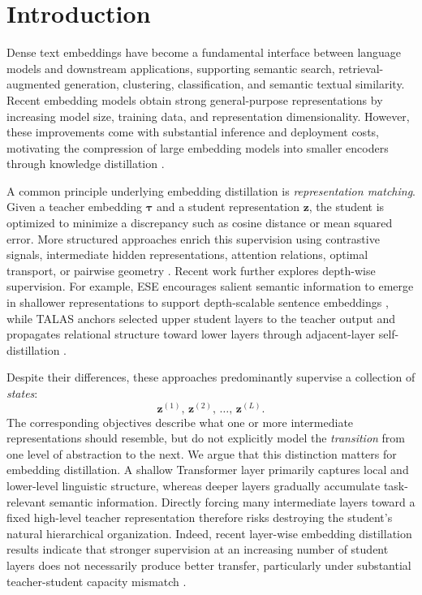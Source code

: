 \documentclass[11pt]{article}
\begin{document}

\section{Introduction}\label{sec:introduction}

Dense text embeddings have become a fundamental interface between language
models and downstream applications, supporting semantic search,
retrieval-augmented generation, clustering, classification, and semantic
textual similarity. Recent embedding models obtain strong general-purpose
representations by increasing model size, training data, and representation
dimensionality. However, these improvements come with substantial inference
and deployment costs, motivating the compression of large embedding models
into smaller encoders through knowledge distillation
\citep{hinton2015distilling,reimers2020multilingual,xu2023distillcse,
zhang2024jasper,truong2025emo}.

A common principle underlying embedding distillation is
\emph{representation matching}. Given a teacher embedding
$\boldsymbol{\tau}$ and a student representation $\mathbf{z}$, the student
is optimized to minimize a discrepancy such as cosine distance or mean
squared error. More structured approaches enrich this supervision using
contrastive signals, intermediate hidden representations, attention
relations, optimal transport, or pairwise geometry
\citep{xu2023distillcse,truong2025emo}.
Recent work further explores depth-wise supervision. For example,
ESE encourages salient semantic information to emerge in shallower
representations to support depth-scalable sentence embeddings
\citep{li2025ese}, while TALAS anchors selected upper student layers to the
teacher output and propagates relational structure toward lower layers
through adjacent-layer self-distillation \citep{talas}.

Despite their differences, these approaches predominantly supervise a
collection of \emph{states}:
\begin{equation}
    \mathbf{z}^{(1)},\,
    \mathbf{z}^{(2)},\,
    \ldots,\,
    \mathbf{z}^{(L)}.
\end{equation}
The corresponding objectives describe what one or more intermediate
representations should resemble, but do not explicitly model the
\emph{transition} from one level of abstraction to the next.
We argue that this distinction matters for embedding distillation.
A shallow Transformer layer primarily captures local and lower-level
linguistic structure, whereas deeper layers gradually accumulate
task-relevant semantic information. Directly forcing many intermediate
layers toward a fixed high-level teacher representation therefore risks
destroying the student's natural hierarchical organization.
Indeed, recent layer-wise embedding distillation results indicate that
stronger supervision at an increasing number of student layers does not
necessarily produce better transfer, particularly under substantial
teacher-student capacity mismatch \citep{talas}.
\end{document}
